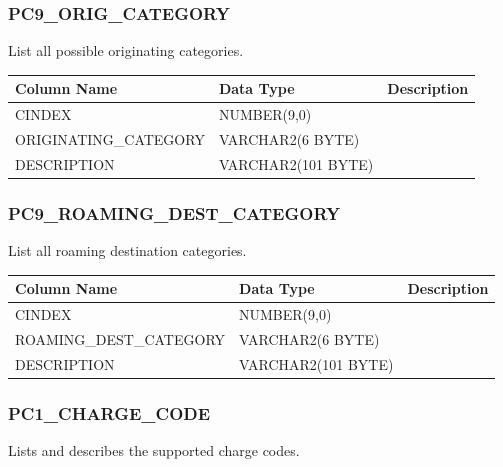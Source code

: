 \documentclass[12pt,twoside]{article}
\begin{document}
\normalsize
\subsubsection{PC9\_ORIG\_CATEGORY}
\label{sec-9-14-12}

   List all possible originating categories.
\scriptsize

\begin{center}
\begin{tabular}{lll}
\hline
 \textbf{Column Name}   &  \textbf{Data Type}  &  \textbf{Description}  \\
\hline
 CINDEX                 &  NUMBER(9,0)         &                        \\
 ORIGINATING\_CATEGORY  &  VARCHAR2(6 BYTE)    &                        \\
 DESCRIPTION            &  VARCHAR2(101 BYTE)  &                        \\
\hline
\end{tabular}
\end{center}



\normalsize
\subsubsection{PC9\_ROAMING\_DEST\_CATEGORY}
\label{sec-9-14-13}

   List all roaming destination categories.
\scriptsize

\begin{center}
\begin{tabular}{lll}
\hline
 \textbf{Column Name}     &  \textbf{Data Type}  &  \textbf{Description}  \\
\hline
 CINDEX                   &  NUMBER(9,0)         &                        \\
 ROAMING\_DEST\_CATEGORY  &  VARCHAR2(6 BYTE)    &                        \\
 DESCRIPTION              &  VARCHAR2(101 BYTE)  &                        \\
\hline
\end{tabular}
\end{center}



\normalsize
\subsubsection{PC1\_CHARGE\_CODE}
\label{sec-9-14-14}

   Lists and describes the supported charge codes.
\scriptsize
\end{document}
